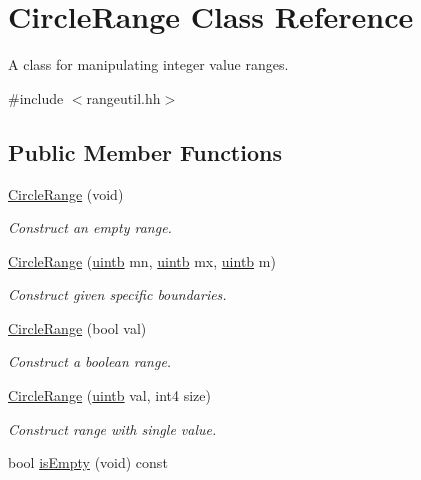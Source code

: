 \hypertarget{class_circle_range}{}\section{Circle\+Range Class Reference}
\label{class_circle_range}


A class for manipulating integer value ranges.  




{\ttfamily \#include $<$rangeutil.\+hh$>$}

\subsection*{Public Member Functions}
\begin{DoxyCompactItemize}
\item 
\mbox{\hyperlink{class_circle_range_a4771182938dbac834d9474c5603ef2e3}{Circle\+Range}} (void)
\begin{DoxyCompactList}\small\item\em Construct an empty range. \end{DoxyCompactList}\item 
\mbox{\hyperlink{class_circle_range_a103e8c9764ba08acce7a179e5b4ecff7}{Circle\+Range}} (\mbox{\hyperlink{types_8h_a2db313c5d32a12b01d26ac9b3bca178f}{uintb}} mn, \mbox{\hyperlink{types_8h_a2db313c5d32a12b01d26ac9b3bca178f}{uintb}} mx, \mbox{\hyperlink{types_8h_a2db313c5d32a12b01d26ac9b3bca178f}{uintb}} m)
\begin{DoxyCompactList}\small\item\em Construct given specific boundaries. \end{DoxyCompactList}\item 
\mbox{\hyperlink{class_circle_range_a5e27e7c2f13b6bcc509d80723d62ab7a}{Circle\+Range}} (bool val)
\begin{DoxyCompactList}\small\item\em Construct a boolean range. \end{DoxyCompactList}\item 
\mbox{\hyperlink{class_circle_range_a7117ce750ace3935fbe5656cd7d918bb}{Circle\+Range}} (\mbox{\hyperlink{types_8h_a2db313c5d32a12b01d26ac9b3bca178f}{uintb}} val, int4 size)
\begin{DoxyCompactList}\small\item\em Construct range with single value. \end{DoxyCompactList}\item 
bool \mbox{\hyperlink{class_circle_range_a2f1ae90649907ae47662da51137b363c}{is\+Empty}} (void) const

\end{DoxyCompactItemize}
